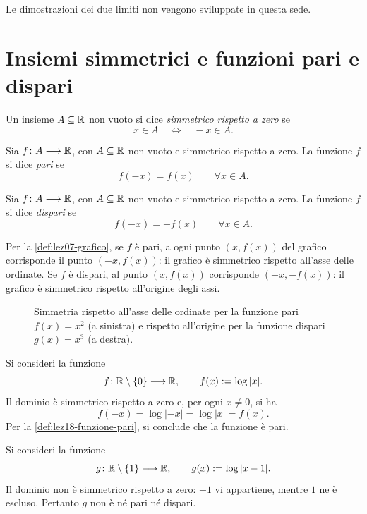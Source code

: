 Le dimostrazioni dei due limiti non vengono sviluppate
in questa sede.

\clearpage

\section{Insiemi simmetrici e funzioni pari e dispari}
\label{sec:lez18-parita}

\begin{definition}
\label{def:lez18-insieme-simmetrico}
Un insieme \(A\subseteq\mathbb{R}\) non vuoto si dice
\emph{simmetrico rispetto a zero} se
\[
  x\in A\quad\Longleftrightarrow\quad -x\in A.
\]
\end{definition}

\begin{definition}
\label{def:lez18-funzione-pari}
Sia \(f\colon A\longrightarrow\mathbb{R}\), con
\(A\subseteq\mathbb{R}\) non vuoto e simmetrico rispetto a zero.
La funzione \(f\) si dice \emph{pari} se
\[
  f(-x)=f(x)\qquad\forall x\in A.
\]
\end{definition}

\begin{definition}
\label{def:lez18-funzione-dispari}
Sia \(f\colon A\longrightarrow\mathbb{R}\), con
\(A\subseteq\mathbb{R}\) non vuoto e simmetrico rispetto a zero.
La funzione \(f\) si dice \emph{dispari} se
\[
  f(-x)=-f(x)\qquad\forall x\in A.
\]
\end{definition}

Per la \cref{def:lez07-grafico},
se \(f\) è pari, a ogni punto \((x,f(x))\) del grafico
corrisponde il punto \((-x,f(x))\): il grafico è
simmetrico rispetto all'asse delle ordinate.
Se \(f\) è dispari, al punto \((x,f(x))\) corrisponde
\((-x,-f(x))\): il grafico è simmetrico rispetto
all'origine degli assi.

\begin{figure}[htbp]
  \centering
  
  \caption{Simmetria rispetto all'asse delle ordinate
  per la funzione pari \(f(x)=x^2\) (a sinistra)
  e rispetto all'origine per la funzione dispari
  \(g(x)=x^3\) (a destra).}
  \label{fig:lez18-pari-dispari}
\end{figure}

\begin{example}
\label{ex:lez18-logaritmo-valore-assoluto}
Si consideri la funzione
\[
  f\colon\mathbb{R}\setminus\{0\}\longrightarrow\mathbb{R},
  \qquad f(x):=\log|x|.
\]
Il dominio è simmetrico rispetto a zero e, per ogni
\(x\ne0\), si ha
\[
  f(-x)=\log|-x|=\log|x|=f(x).
\]
Per la \cref{def:lez18-funzione-pari},
si conclude che la funzione è pari.
\end{example}

\begin{example}
\label{ex:lez18-logaritmo-traslato}
Si consideri la funzione
\[
  g\colon\mathbb{R}\setminus\{1\}\longrightarrow\mathbb{R},
  \qquad g(x):=\log|x-1|.
\]
Il dominio non è simmetrico rispetto a zero:
\(-1\) vi appartiene, mentre \(1\) ne è escluso.
Pertanto \(g\) non è né pari né dispari.
\end{example}
